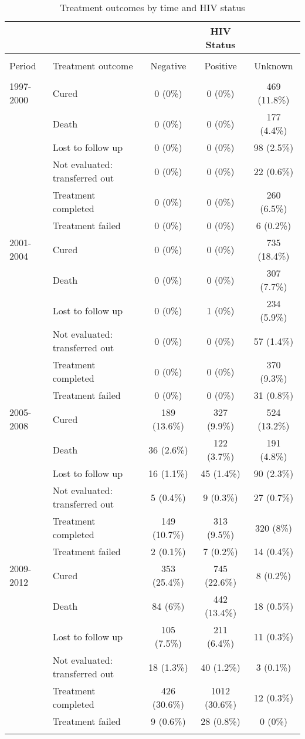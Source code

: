 \documentclass{article}
\begin{document}

\begin{table}[!htbp] \centering 
  \caption{Treatment outcomes by time and HIV status} 
  \label{} 
\begin{tabular}{@{\extracolsep{5pt}} llccc} 
\\[-1.8ex]\hline 
&&& HIV Status & \\
\hline \\[-1.8ex] 
Period & Treatment outcome & Negative & Positive & Unknown \\ 
\hline \\[-1.8ex] 
1997-2000 & Cured & 0 (0\%) & 0 (0\%) & 469 (11.8\%) \\ 
 & Death & 0 (0\%) & 0 (0\%) & 177 (4.4\%) \\ 
 & Lost to follow up & 0 (0\%) & 0 (0\%) & 98 (2.5\%) \\ 
 & Not evaluated: transferred out & 0 (0\%) & 0 (0\%) & 22 (0.6\%) \\ 
 & Treatment completed & 0 (0\%) & 0 (0\%) & 260 (6.5\%) \\ 
 & Treatment failed & 0 (0\%) & 0 (0\%) & 6 (0.2\%) \\ 
2001-2004 & Cured & 0 (0\%) & 0 (0\%) & 735 (18.4\%) \\ 
 & Death & 0 (0\%) & 0 (0\%) & 307 (7.7\%) \\ 
 & Lost to follow up & 0 (0\%) & 1 (0\%) & 234 (5.9\%) \\ 
 & Not evaluated: transferred out & 0 (0\%) & 0 (0\%) & 57 (1.4\%) \\ 
 & Treatment completed & 0 (0\%) & 0 (0\%) & 370 (9.3\%) \\ 
 & Treatment failed & 0 (0\%) & 0 (0\%) & 31 (0.8\%) \\ 
2005-2008 & Cured & 189 (13.6\%) & 327 (9.9\%) & 524 (13.2\%) \\ 
 & Death & 36 (2.6\%) & 122 (3.7\%) & 191 (4.8\%) \\ 
 & Lost to follow up & 16 (1.1\%) & 45 (1.4\%) & 90 (2.3\%) \\ 
 & Not evaluated: transferred out & 5 (0.4\%) & 9 (0.3\%) & 27 (0.7\%) \\ 
 & Treatment completed & 149 (10.7\%) & 313 (9.5\%) & 320 (8\%) \\ 
 & Treatment failed & 2 (0.1\%) & 7 (0.2\%) & 14 (0.4\%) \\ 
2009-2012 & Cured & 353 (25.4\%) & 745 (22.6\%) & 8 (0.2\%) \\ 
 & Death & 84 (6\%) & 442 (13.4\%) & 18 (0.5\%) \\ 
 & Lost to follow up & 105 (7.5\%) & 211 (6.4\%) & 11 (0.3\%) \\ 
 & Not evaluated: transferred out & 18 (1.3\%) & 40 (1.2\%) & 3 (0.1\%) \\ 
 & Treatment completed & 426 (30.6\%) & 1012 (30.6\%) & 12 (0.3\%) \\ 
 & Treatment failed & 9 (0.6\%) & 28 (0.8\%) & 0 (0\%) \\ 
\hline \\[-1.8ex] 
\end{tabular} 
\end{table}
\end{document}

